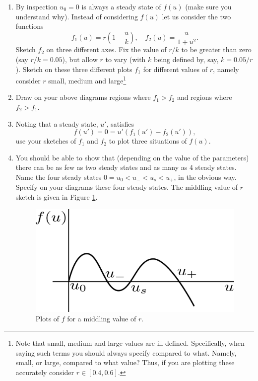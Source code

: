 \documentclass[]{article}
\newcommand{\bb}{\begin{equation}}
\newcommand{\ee}{\end{equation}}
\newcommand{\fig}[1]{Figure \ref{#1}}
\newcommand{\ttp}{.45\textwidth}
\renewcommand{\l}{\left(}
\renewcommand{\r}{\right)}
\begin{document}
\begin{enumerate}
\item By inspection $u_0=0$ is always a steady state of $f(u)$ (make sure you understand why). Instead of considering $f(u)$ let us consider the two functions
\bb
f_1(u)=r\l 1-\frac{u}{k}\r,\quad f_2(u)=\frac{u}{1+u^2}.
\ee
Sketch $f_2$ on three different axes. Fix the value of $r/k$ to be greater than zero (say $r/k=0.05$), but allow $r$ to vary (with $k$ being defined by, say, $k=0.05/r$). Sketch on these three different plots $f_1$ for different values of $r$, namely consider $r$ small, medium and large\footnote{Note that small, medium and large values are ill-defined. Specifically, when saying such terms you should always specify compared to what. Namely, small, or large, compared to what value? Thus, if you are plotting these accurately consider $r\in [0.4,0.6]$.}



\item Draw on your above diagrams regions where $f_1>f_2$ and regions where $f_2>f_1$.

\item Noting that a steady state, $u'$, satisfies
\bb
f(u')=0=u'(f_1(u')-f_2(u')),
\ee
use your sketches of $f_1$ and $f_2$ to plot three situations of $f(u)$\label{sketch_f}.

\item You should be able to show that (depending on the value of the parameters) there can be as few as two steady states and as many as 4 steady states. Name the four steady states $0=u_0<u_-<u_s<u_+$, in the obvious way. Specify on your diagrams these four steady states.  The middling value of $r$ sketch is given in \fig{r_medium}.
\begin{figure}[h!!!tb]
\centering
\includegraphics[width=\ttp]{../../Pictures/Spruce_budworm_r_medium.png}
\caption{\label{r_medium} Plots of $f$ for a middling value of $r$.}
\end{figure}


\end{enumerate}
\end{document}
